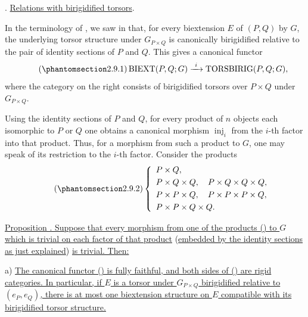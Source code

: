 
. \underline{Relations with birigidified torsors}.

In the terminology of , we saw in  that, for every
biextension $E$ of $(P,Q)$ by $G$, the underlying torsor structure
under $G_{P\times Q}$ is canonically birigidified relative to the pair
of identity sections of $P$ and $Q$. This gives a canonical functor
\begin{equation}\tag{\SGARefTarget{sga7.sga7i.evii.n2-9-1}{2.9.1}}
 \operatorname{BIEXT}(P,Q;G)
 \xrightarrow{\ i\ }
 \operatorname{TORSBIRIG}(P,Q;G),
\end{equation}
where the category on the right consists of birigidified torsors over
$P\times Q$ under $G_{P\times Q}$.

Using the identity sections of $P$ and $Q$, for every product of $n$
objects each isomorphic to $P$ or $Q$ one obtains a canonical
morphism $\operatorname{inj}_i$ from the $i$-th factor into that
product. Thus, for a morphism from such a product to $G$, one may speak
of its restriction to the $i$-th factor. Consider the products
\begin{equation}\tag{\SGARefTarget{sga7.sga7i.evii.n2-9-2}{2.9.2}}
 \left\{
 \begin{array}{l}
 P\times Q,\\[1mm]
 P\times Q\times Q,\quad P\times Q\times Q\times Q,\\[1mm]
 P\times P\times Q,\quad P\times P\times P\times Q,\\[1mm]
 P\times P\times Q\times Q.
 \end{array}
 \right.
\end{equation}

\underline{Proposition . Suppose that every morphism from one of
the products () to $G$ which is trivial on each factor of that
product} (\underline{embedded by the identity sections as just explained}) \underline{is
trivial. Then:}

\medskip
\noindent
a) \underline{The canonical functor () is fully faithful, and
both sides of () are rigid categories. In particular, if $E$ is a
torsor under $G_{P\times Q}$ birigidified relative to $(e_P,e_Q)$,
there is at most one biextension structure on $E$ compatible with its
birigidified torsor structure.}

